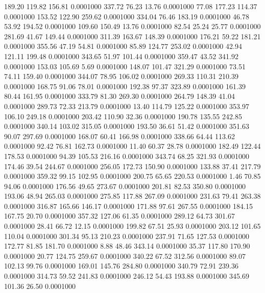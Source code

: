  189.20  119.82  156.81   0.0001000
 337.72   76.23   13.76   0.0001000
  77.08  177.23  114.37   0.0001000
 153.52  122.90  259.62   0.0001000
 334.04   76.46  183.19   0.0001000
  46.78   53.92  194.52   0.0001000
 109.60  150.49   13.76   0.0001000
  82.54   25.24   25.77   0.0001000
 281.69   41.67  149.44   0.0001000
 311.39  163.67  148.39   0.0001000
 176.21   59.22  181.21   0.0001000
 355.56   47.19   54.81   0.0001000
  85.89  124.77  253.02   0.0001000
  42.94  121.11  199.48   0.0001000
 343.65   51.97  101.44   0.0001000
 359.47   43.52  341.92   0.0001000
 153.03  105.69    5.69   0.0001000
 148.07  101.47  321.29   0.0001000
  73.51   74.11  159.40   0.0001000
 344.07   78.95  106.02   0.0001000
 269.33  110.31  210.39   0.0001000
 168.75   91.06   78.01   0.0001000
 192.38   97.37  323.89   0.0001000
 161.39   80.44  161.95   0.0001000
 333.79   81.30  269.30   0.0001000
 264.79  148.39   41.04   0.0001000
 289.73   72.33  213.79   0.0001000
  13.40  114.79  125.22   0.0001000
 353.97  106.10  249.18   0.0001000
 203.42  110.90   32.36   0.0001000
 190.78  135.55  242.85   0.0001000
 340.14  103.02  315.05   0.0001000
 193.50   36.61   51.42   0.0001000
 351.63   90.07  297.69   0.0001000
 168.07   60.41  166.98   0.0001000
 338.66   64.44  113.62   0.0001000
  92.42   76.81  162.73   0.0001000
  11.40   60.37   28.78   0.0001000
 182.49  122.44  178.53   0.0001000
  94.39  105.53  216.16   0.0001000
 343.74   68.25  321.93   0.0001000
 174.46   39.54  244.67   0.0001000
 256.05  172.73  150.90   0.0001000
 133.88   37.41  217.79   0.0001000
 359.32   99.15  102.95   0.0001000
 200.75   65.65  220.53   0.0001000
   1.46   70.85   94.06   0.0001000
 176.56   49.65  273.67   0.0001000
 201.81   82.53  350.80   0.0001000
 193.06   48.94  265.03   0.0001000
 275.85  117.88  267.09   0.0001000
 231.63   79.41  263.38   0.0001000
 316.87  165.66  146.17   0.0001000
 171.88   97.61  267.55   0.0001000
 184.15  167.75   20.70   0.0001000
 357.32  127.06   61.35   0.0001000
 289.12   64.73  301.67   0.0001000
  28.41   66.72   12.15   0.0001000
 199.82   67.51   25.93   0.0001000
 203.12  101.65  110.04   0.0001000
 301.34   95.13  210.23   0.0001000
 237.91   71.65  127.53   0.0001000
 172.77   81.85  181.70   0.0001000
   8.88   48.46  343.14   0.0001000
  35.37  117.80  170.90   0.0001000
  20.77  124.75  259.67   0.0001000
 340.22   67.52  312.56   0.0001000
  89.07  102.13   99.76   0.0001000
 169.01  145.76  284.80   0.0001000
 340.79   72.91  239.36   0.0001000
 314.73   59.52  241.83   0.0001000
 246.12   54.43  193.88   0.0001000
 345.69  101.36   26.50   0.0001000
